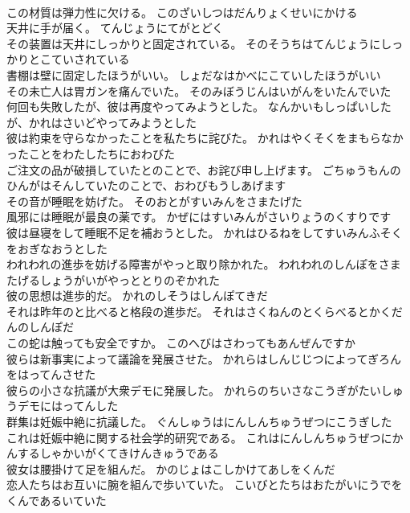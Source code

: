 \documentclass[8pt]{extreport}
\begin{document}
\begin{CJK}{UTF8}{min}
\\	この材質は弾力性に欠ける。	このざいしつはだんりょくせいにかける 
\\	天井に手が届く。	てんじょうにてがとどく 
\\	その装置は天井にしっかりと固定されている。	そのそうちはてんじょうにしっかりとこていされている 
\\	書棚は壁に固定したほうがいい。	しょだなはかべにこていしたほうがいい 
\\	その未亡人は胃ガンを痛んでいた。	そのみぼうじんはいがんをいたんでいた 
\\	何回も失敗したが、彼は再度やってみようとした。	なんかいもしっぱいしたが、かれはさいどやってみようとした 
\\	彼は約束を守らなかったことを私たちに詫びた。	かれはやくそくをまもらなかったことをわたしたちにおわびた 
\\	ご注文の品が破損していたとのことで、お詫び申し上げます。	ごちゅうもんのひんがはそんしていたのことで、おわびもうしあげます 
\\	その音が睡眠を妨げた。	そのおとがすいみんをさまたげた 
\\	風邪には睡眠が最良の薬です。	かぜにはすいみんがさいりょうのくすりです 
\\	彼は昼寝をして睡眠不足を補おうとした。	かれはひるねをしてすいみんふそくをおぎなおうとした 
\\	われわれの進歩を妨げる障害がやっと取り除かれた。	われわれのしんぽをさまたげるしょうがいがやっととりのぞかれた 
\\	彼の思想は進歩的だ。	かれのしそうはしんぽてきだ 
\\	それは昨年のと比べると格段の進歩だ。	それはさくねんのとくらべるとかくだんのしんぽだ 
\\	この蛇は触っても安全ですか。	このへびはさわってもあんぜんですか 
\\	彼らは新事実によって議論を発展させた。	かれらはしんじじつによってぎろんをはってんさせた 
\\	彼らの小さな抗議が大衆デモに発展した。	かれらのちいさなこうぎがたいしゅうデモにはってんした 
\\	群集は妊娠中絶に抗議した。	ぐんしゅうはにんしんちゅうぜつにこうぎした 
\\	これは妊娠中絶に関する社会学的研究である。	これはにんしんちゅうぜつにかんするしゃかいがくてきけんきゅうである 
\\	彼女は腰掛けて足を組んだ。	かのじょはこしかけてあしをくんだ 
\\	恋人たちはお互いに腕を組んで歩いていた。	こいびとたちはおたがいにうでをくんであるいていた 

\end{CJK}
\end{document}
